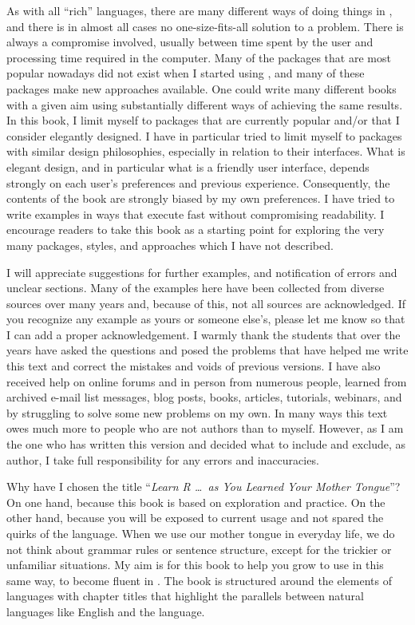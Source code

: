 As with all ``rich'' languages, there are many different ways of doing things in \Rlang, and there is in almost all cases no one-size-fits-all solution to a problem. There is always a compromise involved, usually between time spent by the user and processing time required in the computer. Many of the packages that are most popular nowadays did not exist when I started using \Rlang, and many of these packages make new approaches available. One could write many different \Rlang books with a given aim using substantially different ways of achieving the same results. In this book, I limit myself to packages that are currently popular and/or that I consider elegantly designed. I have in particular tried to limit myself to packages with similar design philosophies, especially in relation to their interfaces. What is elegant design, and in particular what is a friendly user interface, depends strongly on each user's preferences and previous experience. Consequently, the contents of the book are strongly biased by my own preferences. I have tried to write examples in ways that execute fast without compromising readability. I encourage readers to take this book as a starting point for exploring the very many packages, styles, and approaches which I have not described.

I will appreciate suggestions for further examples, and notification of errors and unclear sections. Many of the examples here have been collected from diverse sources over many years and, because of this, not all sources are acknowledged. If you recognize any example as yours or someone else's, please let me know so that I can add a proper acknowledgement. I warmly thank the students that over the years have asked the questions and posed the problems that have helped me write this text and correct the mistakes and voids of previous versions. I have also received help on online forums and in person from numerous people, learned from archived e-mail list messages, blog posts, books, articles, tutorials, webinars, and by struggling to solve some new problems on my own. In many ways this text owes much more to people who are not authors than to myself. However, as I am the one who has written this version and decided what to include and exclude, as author, I take full responsibility for any errors and inaccuracies.

Why have I chosen the title ``\emph{Learn R \ldots\ as You Learned Your Mother Tongue}''? On one hand, because this book is based on exploration and practice. On the other hand, because you will be exposed to current usage and not spared the quirks of the language. When we use our mother tongue in everyday life, we do not think about grammar rules or sentence structure, except for the trickier or unfamiliar situations. My aim is for this book to help you grow to use \Rlang in this same way, to become fluent in \Rlang. The book is structured around the elements of languages with chapter titles that highlight the parallels between natural languages like English and the \Rlang language.

